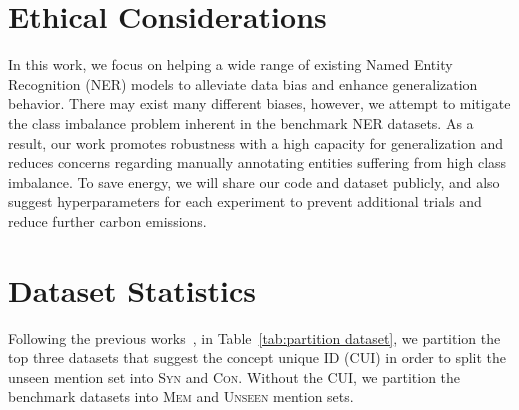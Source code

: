 \documentclass[11pt]{article}
\begin{document}
\section{Ethical Considerations}
In this work, we focus on helping a wide range of existing Named Entity Recognition (NER) models to alleviate data bias and enhance generalization behavior.
There may exist many different biases, however, we attempt to mitigate the class imbalance problem inherent in the benchmark NER datasets.
As a result, our work promotes robustness with a high capacity for generalization and reduces concerns regarding manually annotating entities suffering from high class imbalance.
To save energy, we will share our code and dataset publicly, and also suggest hyperparameters for each experiment to prevent additional trials and reduce further carbon emissions.







\appendix

\section{Dataset Statistics}
\label{app:dataset statistic}

Following the previous works~\cite{lin2020rigourous,kim2021your}, in Table~\ref{tab:partition dataset}, we partition the top three datasets that suggest the concept unique ID (CUI) in order to split the unseen mention set into \textsc{Syn} and \textsc{Con}.
Without the CUI, we partition the benchmark datasets into \textsc{Mem} and \textsc{Unseen} mention sets. 
\end{document}
